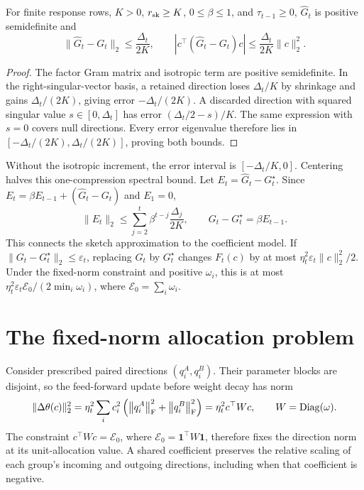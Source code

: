 \begin{proposition}
\label{prop:ledger-error}
For finite response rows, $K>0$, $r_{\rm sk}\geq K$, $0\leq\beta\leq1$, and
$\tau_{t-1}\geq0$, $\widehat G_t$ is positive semidefinite and
\begin{equation}
 \|\widehat G_t-G_t\|_2\leq\frac{\Delta_t}{2K},\qquad
 |c^\top(\widehat G_t-G_t)c|
 \leq\frac{\Delta_t}{2K}\|c\|_2^2.
 \label{eq:rfd-error}
\end{equation}
\end{proposition}
\begin{proof}
The factor Gram matrix and isotropic term are positive semidefinite.
In the right-singular-vector basis, a retained direction loses
$\Delta_t/K$ by shrinkage and gains $\Delta_t/(2K)$, giving
error $-\Delta_t/(2K)$. A discarded direction with squared singular
value $s\in[0,\Delta_t]$ has error $(\Delta_t/2-s)/K$.
The same expression with $s=0$ covers null directions. Every error
eigenvalue therefore lies in
$[-\Delta_t/(2K),\Delta_t/(2K)]$, proving both bounds.
\end{proof}

Without the isotropic increment, the error interval is
$[-\Delta_t/K,0]$. Centering halves this one-compression spectral
bound. Let $E_t=\widehat G_t-G_t^\star$. Since
$E_t=\beta E_{t-1}+(\widehat G_t-G_t)$ and $E_1=0$,
\begin{equation}
 \|E_t\|_2\leq\sum_{j=2}^t\beta^{t-j}\frac{\Delta_j}{2K},
 \qquad G_t-G_t^\star=\beta E_{t-1}.
 \label{eq:rfd-history-error}
\end{equation}
This connects the sketch approximation to the coefficient model.
If $\|G_t-G_t^\star\|_2\leq\varepsilon_t$, replacing $G_t$ by
$G_t^\star$ changes $F_t(c)$ by at most
$\eta_t^2\varepsilon_t\|c\|_2^2/2$.
Under the fixed-norm constraint and positive $\omega_i$, this is
at most $\eta_t^2\varepsilon_t\mathcal E_0/(2\min_i\omega_i)$,
where $\mathcal E_0=\sum_i\omega_i$.


\section{The fixed-norm allocation problem}
\label{sec:transaction}

Consider prescribed paired directions $(q_i^A,q_i^B)$. Their parameter
blocks are disjoint, so the feed-forward update before weight decay has
norm
\begin{equation}
 \|\Delta\theta(c)\|_2^2
 =\eta_t^2\sum_i c_i^2\left(\left\lVert q_i^A\right\rVert_{\mathrm F}^2+\left\lVert q_i^B\right\rVert_{\mathrm F}^2\right)
 =\eta_t^2c^\top Wc,
 \qquad W=\operatorname{Diag}(\omega).
 \label{eq:allocation-norm}
\end{equation}
The constraint $c^\top Wc=\mathcal E_0$, where
$\mathcal E_0=\boldsymbol1^\top W\boldsymbol1$, therefore fixes
the direction norm at its unit-allocation value. A shared coefficient
preserves the relative scaling of each group's incoming and outgoing
directions, including when that coefficient is negative.

